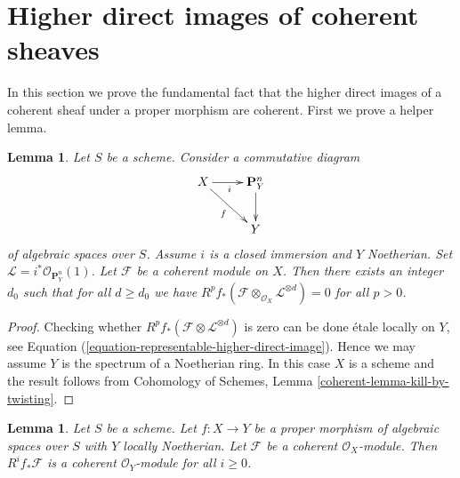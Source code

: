 \documentclass{stacks-project}
\theoremstyle{plain}
\newtheorem{lemma}[subsection]{Lemma}
\theoremstyle{definition}
\theoremstyle{remark}
\numberwithin{equation}{subsection}
\begin{document}
\section{Higher direct images of coherent sheaves}
\label{section-proper-pushforward}

\noindent
In this section we prove the fundamental fact that the higher
direct images of a coherent sheaf under a proper morphism
are coherent. First we prove a helper lemma.

\begin{lemma}
\label{lemma-kill-by-twisting}
Let $S$ be a scheme. Consider a commutative diagram
$$
\xymatrix{
X \ar[r]_i \ar[rd]_f & \mathbf{P}^n_Y \ar[d] \\
& Y
}
$$
of algebraic spaces over $S$. Assume $i$ is a closed immersion
and $Y$ Noetherian. Set $\mathcal{L} = i^*\mathcal{O}_{\mathbf{P}^n_Y}(1)$.
Let $\mathcal{F}$ be a coherent module on $X$.
Then there exists an integer $d_0$ such that for all $d \geq d_0$ we have
$R^pf_*(\mathcal{F} \otimes_{\mathcal{O}_X} \mathcal{L}^{\otimes d}) = 0$
for all $p > 0$.
\end{lemma}

\begin{proof}
Checking whether $R^pf_*(\mathcal{F} \otimes \mathcal{L}^{\otimes d})$
is zero can be done \'etale locally on $Y$, see
Equation (\ref{equation-representable-higher-direct-image}).
Hence we may assume $Y$ is the spectrum of a Noetherian ring. In this case
$X$ is a scheme and the result follows from
Cohomology of Schemes, Lemma \ref{coherent-lemma-kill-by-twisting}.
\end{proof}

\begin{lemma}
\label{lemma-proper-pushforward-coherent}
Let $S$ be a scheme. Let $f : X \to Y$ be a proper morphism
of algebraic spaces over $S$ with $Y$ locally Noetherian.
Let $\mathcal{F}$ be a coherent $\mathcal{O}_X$-module.
Then $R^if_*\mathcal{F}$ is a coherent $\mathcal{O}_Y$-module
for all $i \geq 0$.
\end{lemma}
\end{document}
